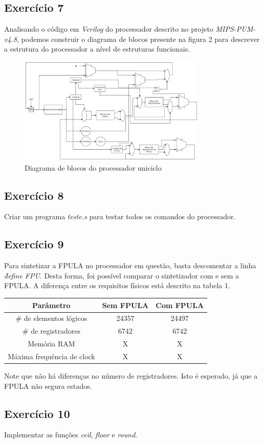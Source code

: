 \documentclass[12pt, a4paper, twoside]{article}
\begin{document}
\subsection{Exercício 7}

Analisando o código em \textit{Verilog} do processador descrito no projeto \textit{MIPS-PUM-v4.8}, podemos construir o diagrama de blocos presente na figura 2 para descrever a estrutura do processador a nível de estruturas funcionais.

\begin{figure}
    \centering
    \includegraphics[width=0.8\textwidth]{./figs/UNICICLO.png}
    \caption{Diagrama de blocos do processador uniciclo}
\end{figure}


\subsection{Exercício 8}

Criar um programa \textit{teste.s} para testar todos os comandos do processador.

\subsection{Exercício 9}

Para sintetizar a FPULA no processador em questão, basta descomentar a linha \textit{\` define FPU}. Desta forma, foi possível comparar o sintetizador com e sem a FPULA. A diferença entre os requisitos físicos está descrito na tabela 1.

\begin{center}
  \begin{tabular}{ | c | c | c | }
    \hline
    Parâmetro                  & Sem FPULA & Com FPULA \\ \hline \hline
    \# de elementos lógicos    & 24357     & 24497     \\ \hline
    \# de registradores        & 6742      & 6742      \\ \hline
    Memória RAM                & X         & X         \\ \hline
    Máxima frequência de clock & X         & X         \\ \hline
  \end{tabular}
\end{center}

Note que não há diferenças no número de registradores. Isto é esperado, já que a FPULA não segura estados.

\subsection{Exercício 10}

Implementar as funções \textit{ceil}, \textit{floor} e \textit{round}.
\end{document}
